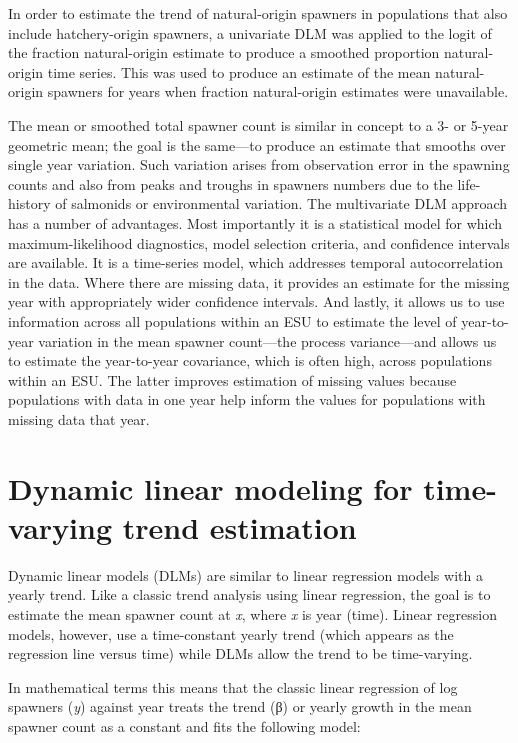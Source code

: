\documentclass[
  letterpaper,
  oneside,
  open=any]{scrbook}
\begin{document}
In order to estimate the trend of natural-origin spawners in populations
that also include hatchery-origin spawners, a univariate DLM was applied
to the logit of the fraction natural-origin estimate to produce a
smoothed proportion natural-origin time series. This was used to produce
an estimate of the mean natural-origin spawners for years when fraction
natural-origin estimates were unavailable.

The mean or smoothed total spawner count is similar in concept to a 3-
or 5-year geometric mean; the goal is the same---to produce an estimate
that smooths over single year variation. Such variation arises from
observation error in the spawning counts and also from peaks and troughs
in spawners numbers due to the life-history of salmonids or
environmental variation. The multivariate DLM approach has a number of
advantages. Most importantly it is a statistical model for which
maximum-likelihood diagnostics, model selection criteria, and confidence
intervals are available. It is a time-series model, which addresses
temporal autocorrelation in the data. Where there are missing data, it
provides an estimate for the missing year with appropriately wider
confidence intervals. And lastly, it allows us to use information across
all populations within an ESU to estimate the level of year-to-year
variation in the mean spawner count---the process variance---and allows
us to estimate the year-to-year covariance, which is often high, across
populations within an ESU. The latter improves estimation of missing
values because populations with data in one year help inform the values
for populations with missing data that year.

\hypertarget{dynamic-linear-modeling-for-time-varying-trend-estimation}{%
\section{Dynamic linear modeling for time-varying trend
estimation}\label{dynamic-linear-modeling-for-time-varying-trend-estimation}}

Dynamic linear models (DLMs) are similar to linear regression models
with a yearly trend. Like a classic trend analysis using linear
regression, the goal is to estimate the mean spawner count at \emph{x},
where \emph{x} is year (time). Linear regression models, however, use a
time-constant yearly trend (which appears as the regression line versus
time) while DLMs allow the trend to be time-varying.

In mathematical terms this means that the classic linear regression of
log spawners (\emph{y}) against year treats the trend (β) or yearly
growth in the mean spawner count as a constant and fits the following
model:
\end{document}
